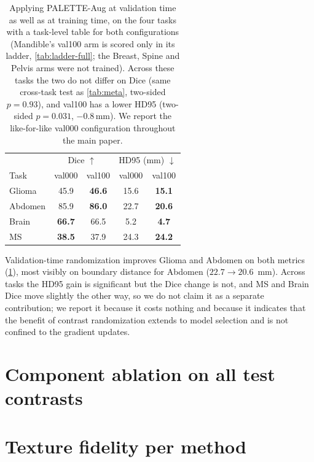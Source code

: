 \begin{table}[t]
\centering
\small
\setlength{\tabcolsep}{4pt}
\begin{tabular}{lcc|cc}
\toprule
 & \multicolumn{2}{c|}{Dice $\uparrow$} & \multicolumn{2}{c}{HD95 (mm) $\downarrow$} \\
Task & val000 & val100 & val000 & val100 \\
\midrule
Glioma    & 45.9 & \textbf{46.6} & 15.6 & \textbf{15.1} \\
Abdomen        & 85.9 & \textbf{86.0} & 22.7 & \textbf{20.6} \\
Brain   & \textbf{66.7} & 66.5 &  5.2 & \textbf{4.7} \\
MS      & \textbf{38.5} & 37.9 & 24.3 & \textbf{24.2} \\
\bottomrule
\end{tabular}
\caption{Applying PALETTE-Aug at validation time as well as at training time, on
the four tasks with a task-level table for both configurations (Mandible's
val100 arm is scored only in its ladder, \cref{tab:ladder-full}; the Breast, Spine and
Pelvis arms were not trained). Across these tasks the two do not differ
on Dice (same cross-task test as \cref{tab:meta}, two-sided $p=0.93$), and
val100 has a lower HD95 (two-sided $p=0.031$, $-0.8$\,mm). We report the
like-for-like val000 configuration throughout the main paper.}
\label{tab:suppl-val100}
\end{table}

Validation-time randomization improves Glioma and Abdomen on both metrics
(\cref{tab:suppl-val100}), most visibly on boundary distance for Abdomen
($22.7 \rightarrow 20.6$~mm). Across tasks the HD95 gain is significant but
the Dice change is not, and MS and Brain Dice move slightly the other way, so we do
not claim it as a separate contribution; we report it because it costs
nothing and because it indicates that the benefit of contrast randomization
extends to model selection and is not confined to the gradient updates.

\FloatBarrier
\section{Component ablation on all test contrasts}
\label{sec:suppl-mechanism}



\FloatBarrier
\section{Texture fidelity per method}
\label{sec:suppl-ngf}

